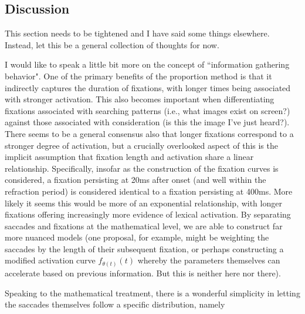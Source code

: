 \documentclass{article}
\begin{document}
\subsection{Discussion}

This section needs to be tightened and I have said some things elsewhere. Instead, let this be a general collection of thoughts for now.



I would like to speak a little bit more on the concept of ``information gathering behavior". One of the primary benefits of the proportion method is that it indirectly captures the duration of fixations, with longer times being associated with stronger activation. This also becomes important when differentiating fixations associated with searching patterns (i.e., what images exist on screen?) against those associated with consideration (is this the image I've just heard?). There seems to be a general consensus also that longer fixations correspond to a stronger degree of activation, but a crucially overlooked aspect of this is the implicit assumption that fixation length and activation share a linear relationship. Specifically, insofar as the construction of the fixation curves is considered, a fixation persisting at 20ms after onset (and well within the refraction period) is considered identical to a fixation persisting at 400ms. More likely it seems this would be more of an exponential relationship, with longer fixations offering increasingly more evidence of lexical activation. By separating saccades and fixations at the mathematical level, we are able to construct far more nuanced models (one proposal, for example, might be weighting the saccades by the length of their subsequent fixation, or perhaps constructing a modified activation curve $f_{\theta(t)}(t)$ whereby the parameters themselves can accelerate based on previous information. But this is neither here nor there).

Speaking to the mathematical treatment, there is a wonderful simplicity in letting the saccades themselves follow a specific distribution, namely
\end{document}
